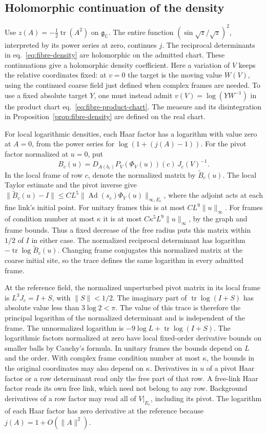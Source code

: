 \documentclass[11pt,letterpaper,reqno]{amsart}
\numberwithin{equation}{section}
\renewcommand{\eqref}[1]{\textup{eq.~\ref{#1}}}
\theoremstyle{definition}
\theoremstyle{remark}
\begin{document}
\subsection{Holomorphic continuation of the density}\label{sec:fibre-continuation}

Use $z(A)=-\tfrac12\operatorname{tr}(A^2)$ on $\mathfrak g_\mathbb C$. The
entire function $(\sin\sqrt z/\sqrt z)^2$, interpreted by its power series at
zero, continues $j$. The reciprocal determinants in \eqref{eq:fibre-density}
are holomorphic on the admitted chart. These continuations give a holomorphic
density coefficient. Here a variation of \(V\) keeps the relative
coordinates fixed: at \(v=0\) the target is the moving value
\(W(V)\), using the continued coarse field just defined when complex
frames are needed. To use a fixed absolute target
\(Y\), one must instead admit
\(v(V)=\log(YW^{-1})\) in the product chart
\eqref{eq:fibre-product-chart}.
The measure and its disintegration in
Proposition~\ref{prop:fibre-density} are defined on the real chart.

For local logarithmic densities, each Haar factor has a logarithm with value
zero at $A=0$, from the power series for $\log(1+(j(A)-1))$. For the pivot
factor normalized at $u=0$, put
\[
 B_c(u)=D_{A(b_c)}P_V(\Phi_V(u))(c)\,J_c(V)^{-1}.
\]
In the local frame of row \(c\), denote the normalized matrix
by \(\widetilde B_c(u)\). The local Taylor estimate and the
pivot inverse give
\(\|\widetilde B_c(u)-I\|\leq C L^5
\|\operatorname{Ad}(s_c)\Phi_V(u)\|_{\infty,E_c}\),
where the adjoint acts at each fine link's initial point.
For unitary frames this is at most \(CL^9\|u\|_\infty\).
For frames of condition number at most \(\kappa\) it is at most
\(C\kappa^5 L^9\|u\|_\infty\), by the graph and frame bounds.
Thus a fixed decrease of the free radius puts this matrix
within \(1/2\) of \(I\) in either case. The normalized reciprocal
determinant has logarithm
\(-\operatorname{tr}\log\widetilde B_c(u)\).
Changing frame conjugates this normalized matrix at the coarse
initial site, so the trace defines the same logarithm in every
admitted frame.

At the reference field, the normalized unperturbed pivot
matrix in its local frame is \(L^3J_c=I+S\), with
\(\|S\|<1/2\). The imaginary part of
\(\operatorname{tr}\log(I+S)\) has absolute value less than
\(3\log 2<\pi\). The value of this trace is therefore the
principal logarithm of the normalized determinant and is
independent of the frame. The unnormalized logarithm is
\(-9\log L+\operatorname{tr}\log(I+S)\).
The logarithmic factors normalized at zero have local
fixed-order derivative bounds on smaller balls by Cauchy's
formula. In unitary frames the bounds depend on \(L\) and the
order. With complex frame condition number at most \(\kappa\),
the bounds in the original coordinates may also depend on
\(\kappa\). Derivatives in \(u\) of a pivot Haar factor or a
row determinant read only the free part of that row. A free-link
Haar factor reads its own free link, which need not belong to any
row. Background derivatives of a row factor may read all of
\(V|_{E_c}\), including its pivot. The logarithm of each Haar
factor has zero derivative
at the reference because \(j(A)=1+O(\|A\|^2)\).
\end{document}
